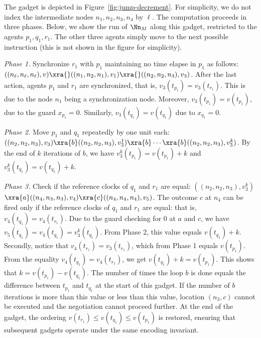 The gadget is depicted in Figure~\ref{fig:jump-decrement}. For simplicity, we do not index the intermediate nodes $n_1, n_2, n_3, n_4$ by $\ell$. The computation proceeds in three phases. Below, we show the run of $\Nn_M$ along this gadget, restricted to the agents $p_1, q_1, r_1$. The other three agents simply move to the next possible instruction (this is not shown in the figure for simplicity). 

\smallskip

\noindent \emph{Phase 1.} Synchronize $r_1$ with $p_1$ maintaining no time
elapse in $p_1$ as follows: $((n_\ell, n_\ell, n_\ell), v) \xra{}
((n_1, n_2, n_1), v_1) \xra{} ((n_2, n_2, n_3), v_3)$. After the last
action, agents $p_1$ and $r_1$ are synchronized, that is,
$v_3(t_{p_1}) = v_3(t_{r_1})$. This is due to the node $n_1$ being a
synchronization node. Moreover, $v_3(t_{p_1}) = v(t_{p_1})$, due to
the guard $x_{p_1} = 0$. Similarly, $v_3(t_{q_1}) = v(t_{q_1})$ due to
$x_{q_1} = 0$.

\smallskip

\noindent \emph{Phase 2.} Move $p_1$ and $q_1$ repeatedly by one unit each:  $((n_2, n_2, n_3), v_3) \xra{b} ((n_2, n_2, n_3), v_3^1) \xra{b} \cdots \xra{b} ((n_2, n_2, n_3), v_3^k)$. By the end of $k$ iterations of $b$, we have $v^k_3(t_{p_1}) = v(t_{p_1}) + k$ and $v^k_3(t_{q_1}) = v(t_{q_1}) + k$.

\smallskip

\noindent \emph{Phase 3.} Check if the reference clocks of $q_1$ and $r_1$
are equal: $((n_2, n_2, n_3), v_3^k)$
$\xra{a} ((n_4, n_3, n_3), v_4) \xra{c} ((n_4, n_4, n_4), v_5)$. The
outcome $c$ at $n_4$ can be fired only if the reference clocks of
$q_1$ and $r_1$ are equal: that is, $v_4(t_{q_1}) = v_4(t_{r_1})$. Due
to the guard checking for $0$ at $a$ and $c$, we have
$v_5(t_{q_1}) = v_4(t_{q_1}) = v_3^k(t_{q_1})$. From Phase 2, this
value equals $v(t_{q_1}) + k$. Secondly, notice that
$v_4(t_{r_1}) = v_3(t_{r_1})$, which from Phase 1 equals
$v(t_{p_1})$. From the equality $v_4(t_{q_1}) = v_4(t_{r_1})$, we get
$v(t_{q_1}) + k = v(t_{p_1})$.  This shows that
$k = v(t_{p_1}) - v({t_{q_1}})$. The number of times the loop $b$ is
done equals the difference between $t_{p_1}$ and $t_{q_1}$ at the
start of this gadget. If the number of $b$ iterations is more than
this value or less than this value, location $(n_3, c)$ cannot be
executed and the negotiation cannot proceed further. At the end of the gadget, the ordering
$v(t_{r_1}) \le v(t_{q_1}) \le v(t_{p_1})$ is restored, ensuring that
subsequent gadgets operate under the same encoding invariant.


